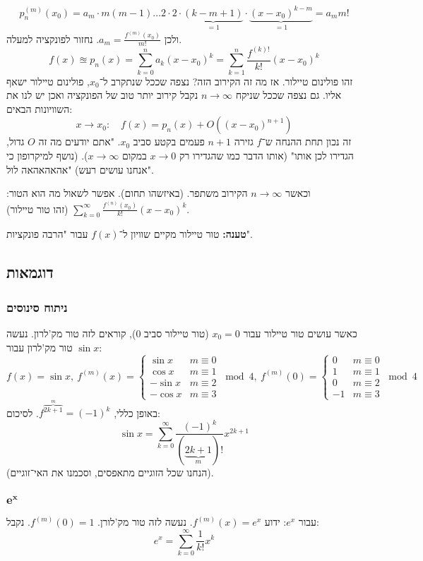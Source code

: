 \documentclass[]{article}
\newcommand\cosx  {\cos x}
\newcommand\sinx  {\sin x}
\renewcommand\inf {\infty}
\newcommand\sumnko    {\sum_{k = 1}^{n}}
\begin{document}
	\[ p_n^{(m)}(x_0) = a_m \cdot m(m - 1) \dots 2 \cdot 2 \cdot \underbrace{(k - m + 1)}_{= 1} \cdot \underbrace{(x - x_0)^{k - m}}_{=1} = a_mm! \]
	ולכן $a_m = \frac{f^{(m)}(x_0)}{m!}$. נחזור לפונקציה למעלה. 
	\[ f(x) \approxeq p_n(x) = \sum_{k = 0}^{n}a_k(x - x_0)^k = \sumnko \frac{f^{(k)!}}{k!}(x - x_0)^k \]
	זהו פולינום טיילור. 
	אז מה זה הקירוב הזה? נצפה שככל שנתקרב ל־$x_0$, פולינום טיילור ישאף אליו. גם נצפה שככל שניקח $n \to \inf$ נקבל קירוב יותר טוב של הפונקציה ואכן יש לנו את השוויונות הבאים: 
	\[ x \to x_0 \colon \quad f(x) = p_n(x) + O((x - x_0)^{n + 1}) \]
	זה נכון תחת ההנחה ש־$f$ גזירה $n + 1$ פעמים בקטע סביב $x_0$. 
	"אתם יודעים מה זה $O$ גדול, הגדירו לכן אותו" (אותו הדבר כמו שהגדירו רק $x \to 0$ במקום $x \to \inf$). (נושף למיקרופון כי אנחנו עושים רעש) "אהאהאהאה לול". 
	
	וכאשר $n \to \inf$ הקירוב משתפר. (באיזשהו תחום). אפשר לשאול מה הוא הטור: 
	$\sum_{k = 0}^{\inf} \frac{f^{(n)}(x_0)}{k!}(x - x_0)^k$ (זהו טור טיילור). 
	
	\textbf{טענה: }טור טיילור מקיים שוויון ל־$f(x)$ עבור "הרבה פונקציות". 
	
	\subsection{דוגמאות}
		\subsubsection{ניתוח סינוסים}
		כאשר עושים טור טיילור עבור $x_0 = 0$ (טור טיילור סביב $0$), קוראים לזה טור מק'לרון. נעשה טור מק'לרון עבור $\sinx$: 
		\[ f(x) = \sinx, \ f^{(m)}(x) = \begin{cases}
			\sinx & m \equiv 0 \\
			\cosx & m \equiv 1 \\
			-\sinx & m \equiv 2 \\
			-\cosx & m \equiv 3
		\end{cases} \bmod 4, \ f^{(m)}(0) = \begin{cases}
		0 & m \equiv 0 \\
		1 & m \equiv 1 \\
		0 & m \equiv 2 \\
		-1 & m \equiv 3
		\end{cases}\bmod 4 \]
		באופן כללי, $f^{\overbrace{2k + 1}^m} = (-1)^{k}$. לסיכום: 
		\[ \sinx = \sum_{k = 0}^{\inf}\frac{(-1)^{k}}{(\underbrace{2k + 1}_{m})!}x^{2k + 1} \]
		(הנחנו שכל הזוגיים מתאפסים, וסכמנו את האי־זוגיים). 
		\subsubsection{$\bm{e^x}$}
		עבור $e^x$: ידוע $f^{(m)}(x) = e^x$. נעשה לזה טור מק'לורן. $f^{(m)}(0) = 1$. נקבל: 
		\[ e^x = \sum_{k = 0}^{\inf}\frac{1}{k!}x^k \]
\end{document}
